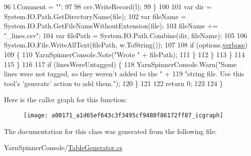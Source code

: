 \begin{DoxyCode}
96                             l.Comment = \textcolor{stringliteral}{""};
97 
98                             csv.WriteRecord(l);
99                         \}
100 
101                         var dir = System.IO.Path.GetDirectoryName(file);
102                         var fileName = System.IO.Path.GetFileNameWithoutExtension(file);
103                         fileName += \textcolor{stringliteral}{"\_lines.csv"};
104                         var filePath = System.IO.Path.Combine(dir, fileName);
105 
106                         System.IO.File.WriteAllText(filePath, w.ToString());
107 
108                         \textcolor{keywordflow}{if} (options.\hyperlink{a00043_ada4d83d1756918f362d55f6649b82b17}{verbose})
109                         \{
110                             YarnSpinnerConsole.Note(\textcolor{stringliteral}{"Wrote "} + filePath);
111                         \}
112                     \}
113                 \}
114 
115             \}
116 
117             \textcolor{keywordflow}{if} (linesWereUntagged) \{
118                 YarnSpinnerConsole.Warn(\textcolor{stringliteral}{"Some lines were not tagged, so they weren't added to the "} +
119                                \textcolor{stringliteral}{"string file. Use this tool's 'generate' action to add them."});
120             \}
121 
122             \textcolor{keywordflow}{return} 0;
123 
124         \}
\end{DoxyCode}


Here is the caller graph for this function\-:
\nopagebreak
\begin{figure}[H]
\begin{center}
\leavevmode
\texttt{[image: a00171\_a1d65ef643c3f3495cf9480f86172ff87\_icgraph]}
\end{center}
\end{figure}




The documentation for this class was generated from the following file\-:\begin{DoxyCompactItemize}
\item 
Yarn\-Spinner\-Console/\hyperlink{a00330}{Table\-Generator.\-cs}\end{DoxyCompactItemize}
